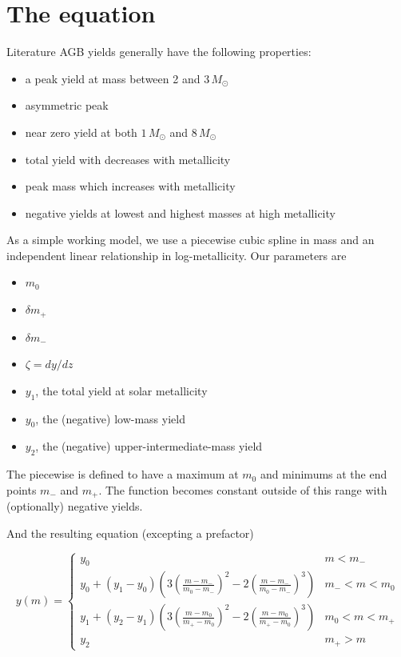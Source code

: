 \hypertarget{the-equation}{%
\section{The equation}\label{the-equation}}

Literature AGB yields generally have the following properties:

\begin{itemize}
\tightlist
\item
  a peak yield at mass between 2 and \(3\,M_\odot\)
\item
  asymmetric peak
\item
  near zero yield at both \(1\,M_\odot\) and \(8\,M_\odot\)
\item
  total yield with decreases with metallicity
\item
  peak mass which increases with metallicity
\item
  negative yields at lowest and highest masses at high metallicity
\end{itemize}

As a simple working model, we use a piecewise cubic spline in mass and
an independent linear relationship in log-metallicity. Our parameters
are

\begin{itemize}
\tightlist
\item
  \(m_0\)
\item
  \(\delta m_+\)
\item
  \(\delta m_-\)
\item
  \(\zeta = dy/dz\)
\item
  \(y_1\), the total yield at solar metallicity
\item
  \(y_0\), the (negative) low-mass yield
\item
  \(y_2\), the (negative) upper-intermediate-mass yield
\end{itemize}

The piecewise is defined to have a maximum at \(m_0\) and minimums at
the end points \(m_-\) and \(m_+\). The function becomes constant
outside of this range with (optionally) negative yields.

And the resulting equation (excepting a prefactor)

\[
y(m) = \begin{cases}
y_0 & m < m_- \\
y_0 + (y_1 - y_0) \left(3 (\frac{m - m_-}{m_0 - m_-})^2 - 
2 (\frac{m-m_-}{m_0 - m_-})^3\right) & m_- < m < m_0 \\
y_1 + (y_2 - y_1) \left(3 (\frac{m - m_0}{m_+ - m_0})^2 - 
2 (\frac{m-m_0}{m_+ - m_0})^3\right) & m_0 < m < m_+ \\
y_2 & m_+ > m
\end{cases}
\]

